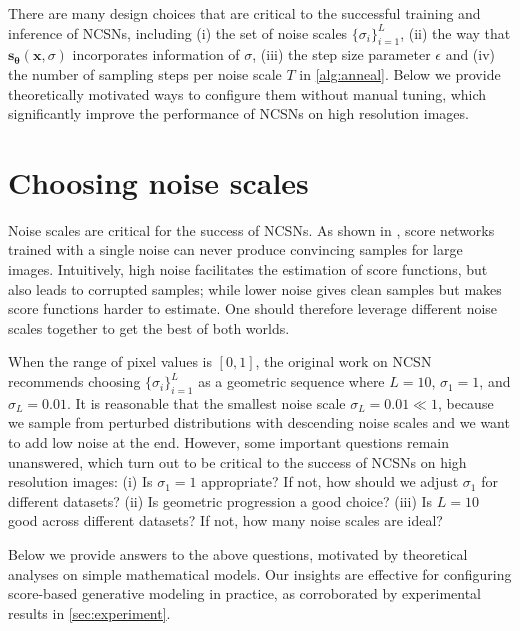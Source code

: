 \documentclass{article}
\newcommand{\bfx}{\mathbf{x}}
\newcommand{\bftheta}{{\boldsymbol{\theta}}}
\newcommand{\bfs}{\mathbf{s}}
\begin{document}
There are many design choices that are critical to the successful training and inference of NCSNs, including (i) the set of noise scales $\{\sigma_i\}_{i=1}^L$, (ii) the way that $\bfs_\bftheta(\bfx, \sigma)$ incorporates information of $\sigma$, (iii) the step size parameter $\epsilon$ and (iv) the number of sampling steps per noise scale $T$ in \cref{alg:anneal}. Below we provide theoretically motivated ways to configure them without manual tuning, which significantly improve the performance of NCSNs on high resolution images.

 \section{Choosing noise scales}
Noise scales are critical for the success of NCSNs. As shown in \cite{song2019generative}, score networks trained with a single noise can never produce convincing samples for large images. Intuitively, high noise facilitates the estimation of score functions, but also leads to corrupted samples; while lower noise gives clean samples but makes score functions harder to estimate. One should therefore leverage different noise scales together to get the best of both worlds.

When the range of pixel values is $[0, 1]$, the original work on NCSN~\cite{song2019generative} recommends choosing $\{\sigma_i\}_{i=1}^L$ as a geometric sequence where $L = 10$, $\sigma_1 = 1$, and $\sigma_{L} = 0.01$. It is reasonable that the smallest noise scale $\sigma_L = 0.01 \ll 1$, because we sample from perturbed distributions with descending noise scales and we want to add low noise at the end.
However, some important questions remain unanswered, which turn out to be critical to the success of NCSNs on high resolution images: (i) Is $\sigma_1 = 1$ appropriate? If not, how should we adjust $\sigma_1$ for different datasets? (ii) Is geometric progression a good choice? (iii) Is $L=10$ good across different datasets? If not, how many noise scales are ideal? 

Below we provide answers to the above questions, motivated by theoretical analyses on simple mathematical models. Our insights are effective for configuring score-based generative modeling in practice, as corroborated by experimental results in \cref{sec:experiment}.
\end{document}
